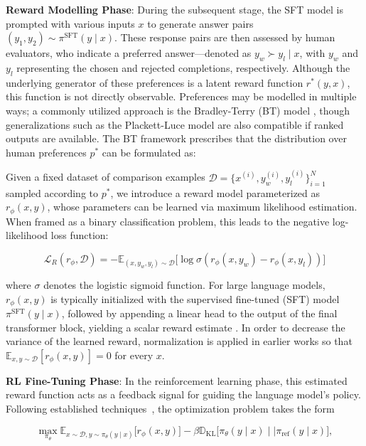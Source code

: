 \textbf{Reward Modelling Phase}: During the subsequent stage, the SFT model is prompted with various inputs $x$ to generate answer pairs $(y_1, y_2)\sim \pi^\text{SFT}(y \mid x)$. These response pairs are then assessed by human evaluators, who indicate a preferred answer—denoted as $y_w\succ y_l \mid x$, with $y_w$ and $y_l$ representing the chosen and rejected completions, respectively. Although the underlying generator of these preferences is a latent reward function $r^*(y, x)$, this function is not directly observable. Preferences may be modelled in multiple ways; a commonly utilized approach is the Bradley-Terry (BT) model \cite{bradley1952rankanalysis}, though generalizations such as the Plackett-Luce model \citep{plackett1975analysis, luce2012individual} are also compatible if ranked outputs are available. The BT framework prescribes that the distribution over human preferences $p^*$ can be formulated as:

Given a fixed dataset of comparison examples $\mathcal{D}=\bigl\{x^{(i)}, y_w^{(i)}, y_l^{(i)}\bigr\}_{i=1}^N$ sampled according to $p^*$, we introduce a reward model parameterized as $r_{\phi}(x, y)$, whose parameters can be learned via maximum likelihood estimation. When framed as a binary classification problem, this leads to the negative log-likelihood loss function:

\begin{equation}\label{eq:reward_model}
    \mathcal{L}_R(r_{\phi}, \mathcal{D}) = -\mathbb{E}_{(x, y_w, y_l)\sim \mathcal{D}}\bigl[\log \sigma(r_{\phi}(x, y_w)- r_{\phi}(x, y_l))\bigr]
\end{equation}

where $\sigma$ denotes the logistic sigmoid function. For large language models, $r_{\phi}(x, y)$ is typically initialized with the supervised fine-tuned (SFT) model $\pi^\text{SFT}(y \mid x)$, followed by appending a linear head to the output of the final transformer block, yielding a scalar reward estimate \cite{ziegler2020finetuning}. In order to decrease the variance of the learned reward, normalization is applied in earlier works so that  $\mathbb{E}_{x,y\sim \mathcal{D}}\left[r_\phi(x, y)\right] = 0$ for every $x$.

\textbf{RL Fine-Tuning Phase}: In the reinforcement learning phase, this estimated reward function acts as a feedback signal for guiding the language model's policy. Following established techniques~\citep{jaques2017sequence, jaques2020human}, the optimization problem takes the form

\begin{equation}\label{eq:RL}
\max_{\pi_{\theta}}  \mathbb{E}_{x\sim \mathcal{D}, y\sim \pi_{\theta}(y \mid x)}\bigl[r_{\phi}(x, y)\bigr] - \beta\mathbb{D}_{\textrm{KL}}\bigl[\pi_{\theta}(y\mid x)\mid \mid \pi_\text{ref}(y\mid x)\bigr],
\end{equation}

